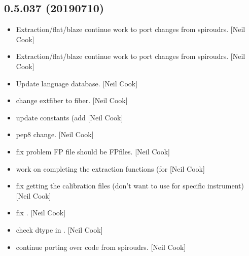 \documentclass[a4paper,10pt,english]{report}
\begin{document}
\subsection{0.5.037 (2019\sphinxhyphen{}07\sphinxhyphen{}10)}
\label{\detokenize{misc/changelog:id123}}\begin{itemize}
\item {} 
Extraction/flat/blaze \sphinxhyphen{} continue work to port changes from spiroudrs.
{[}Neil Cook{]}

\item {} 
Extraction/flat/blaze \sphinxhyphen{} continue work to port changes from spiroudrs.
{[}Neil Cook{]}

\item {} 
Update language database. {[}Neil Cook{]}

\item {} 
 \sphinxhyphen{} change \textendash{}extfiber to \textendash{}fiber. {[}Neil Cook{]}

\item {} 
 \sphinxhyphen{} update constants (add  {[}Neil Cook{]}

\item {} 
 \sphinxhyphen{} pep8 change. {[}Neil Cook{]}

\item {} 
 \sphinxhyphen{} fix problem FP file should be FPfiles.
{[}Neil Cook{]}

\item {} 
 \sphinxhyphen{} work on completing the extraction functions (for
 {[}Neil Cook{]}

\item {} 
 \sphinxhyphen{} fix getting the calibration files (don’t want
to use  for specific instrument) {[}Neil Cook{]}

\item {} 
 \sphinxhyphen{} fix . {[}Neil Cook{]}

\item {} 
 \sphinxhyphen{} check dtype in . {[}Neil
Cook{]}

\item {} 
 \sphinxhyphen{} continue porting over code from spiroudrs. {[}Neil
Cook{]}


\end{itemize}
\end{document}
